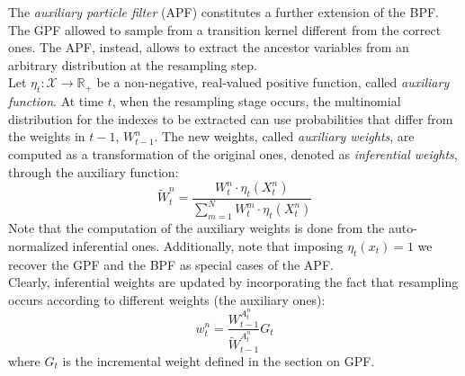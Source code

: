 \documentclass[
]{book}
\theoremstyle{break}
\theoremstyle{nonumberplain}
\begin{document}
The \textit{auxiliary particle filter} (APF) constitutes a further
extension of the BPF. The GPF allowed to sample from a transition kernel
different from the correct ones. The APF, instead, allows to extract the
ancestor variables from an arbitrary distribution at the resampling
step.~\\
Let \(\eta_t:\mathcal X\rightarrow \mathbb R_+\) be a non-negative,
real-valued positive function, called \textit{auxiliary function}. At
time \(t\), when the resampling stage occurs, the multinomial
distribution for the indexes to be extracted can use probabilities that
differ from the weights in \(t-1\), \(W_{t-1}^n\). The new weights,
called \textit{auxiliary weights}, are computed as a transformation of
the original ones, denoted as \textit{inferential weights}, through the
auxiliary function: \begin{equation}
    \tilde W_t^n=\frac{W_t^n\cdot \eta_t(X_t^n)}{\sum_{m=1}^NW_t^m\cdot \eta_t(X_t^n)}
\end{equation} Note that the computation of the auxiliary weights is
done from the auto-normalized inferential ones. Additionally, note that
imposing \(\eta_t(x_t)=1\) we recover the GPF and the BPF as special
cases of the APF.\\
Clearly, inferential weights are updated by incorporating the fact that
resampling occurs according to different weights (the auxiliary ones):
\begin{equation}
    w_t^n=\frac{W_{t-1}^{A_t^n}}{\tilde W_{t-1}^{A_t^n}}G_t \label{apf_weights_up_}
\end{equation} where \(G_t\) is the incremental weight defined in the
section on GPF.~\\
\end{document}
